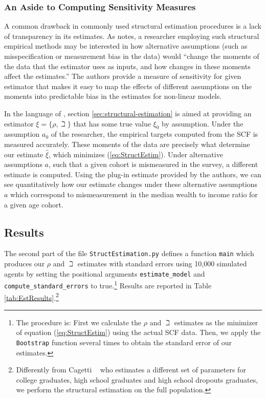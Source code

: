 \documentclass[titlepage, headings=optiontotocandhead]{econtex}
\begin{document}
\subsubsection{An Aside to Computing Sensitivity Measures}\label{subsubsec:sensmeas}


A common drawback in commonly used structural estimation procedures is a lack of transparency in its estimates.  As \cite{andrews2017measuring} notes, a researcher employing such structural empirical methods may be interested in how alternative assumptions (such as misspecification or measurement bias in the data) would ``change the moments of the data that the estimator uses as inputs, and how changes in these moments affect the estimates.'' The authors provide a measure of sensitivity for given estimator that makes it easy to map the effects of different assumptions on the moments into predictable bias in the estimates for non-linear models.

In the language of \cite{andrews2017measuring}, section \ref{sec:structural-estimation} is aimed at providing an estimator $\xi =\{\rho ,\beth\}$ that has some true value $\xi_0 $ by assumption. Under the assumption $a_0$ of the researcher, the empirical targets computed from the SCF is measured accurately. These moments of the data are precisely what determine our estimate $\hat{\xi}$, which minimizes (\ref{eq:StructEstim}). Under alternative assumptions $a$, such that a given cohort is mismeasured in the survey, a different estimate is computed. Using the plug-in estimate provided by the authors, we can see quantitatively how our estimate changes under these alternative assumptions $a$ which correspond to mismeasurement in the median wealth to income ratio for a given age cohort.

\subsection{Results}
The second part of the file \texttt{StructEstimation.py}
defines a function \texttt{main} which produces our $\rho$ and
$\beth$ estimates with standard errors using 10,000 simulated
agents by setting the positional arguments \texttt{estimate\_model} and
\texttt{compute\_standard\_errors} to true.\footnote{The procedure is: First we calculate the $\rho$ and
  $\beth$ estimates as the minimizer of equation
  (\ref{eq:StructEstim}) using the actual SCF data. Then, we apply the
  \texttt{Bootstrap} function several times to obtain the standard
  error of our estimates.} Results are reported in Table
\ref{tab:EstResults}.\footnote{Differently from Cagetti
  ~\citeyearpar{cagettiWprofiles} who estimates a different set of
  parameters for college graduates, high school graduates and high
  school dropouts graduates, we perform the structural estimation on
  the full population.}
\end{document}
